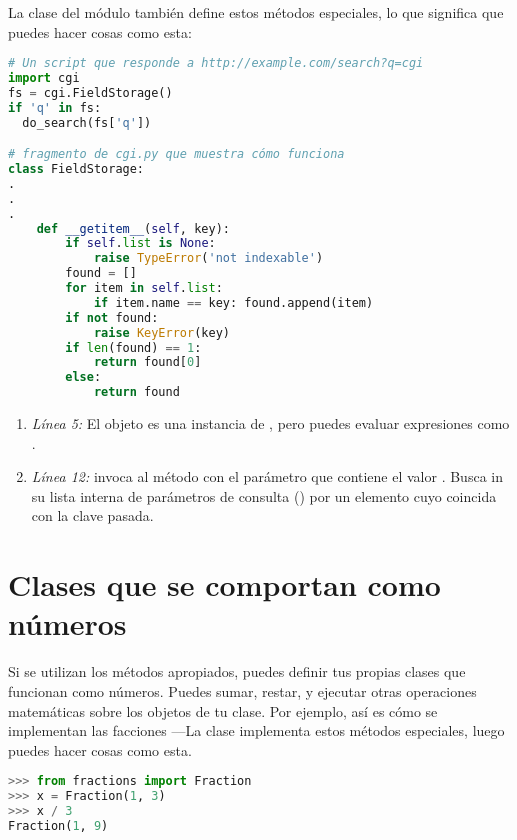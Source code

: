 La clase \href{http://www.diveintopython3.net/special-method-names.html#acts-like-set-example}{} del módulo \href{http://docs.python.org/3.1/library/cgi.html}{} también define estos métodos especiales, lo que significa que puedes hacer cosas como esta:


\begin{lstlisting}[language=Python,breaklines=true,mathescape=false]
# Un script que responde a http://example.com/search?q=cgi
import cgi
fs = cgi.FieldStorage()
if 'q' in fs:
  do_search(fs['q'])    

# fragmento de cgi.py que muestra cómo funciona
class FieldStorage:
.
.
.
    def __getitem__(self, key): 
        if self.list is None:
            raise TypeError('not indexable')
        found = []
        for item in self.list:
            if item.name == key: found.append(item)
        if not found:
            raise KeyError(key)
        if len(found) == 1:
            return found[0]
        else:
            return found
\end{lstlisting}


\begin{enumerate}
  \item \emph{Línea 5:} El objeto  es una instancia de , pero puedes evaluar expresiones como .
  \item \emph{Línea 12:}  invoca al método  con el parámetro  que contiene el valor . Busca in su lista interna de parámetros de consulta () por un elemento cuyo  coincida con la clave pasada.
\end{enumerate}

\section{Clases que se comportan como números}

Si se utilizan los métodos apropiados, puedes definir tus propias clases que funcionan como números. Puedes sumar, restar, y ejecutar otras operaciones matemáticas sobre los objetos de tu clase. Por ejemplo, así es cómo se implementan las facciones ---La clase  implementa estos métodos especiales, luego puedes hacer cosas como esta.


\begin{lstlisting}[language=Python,breaklines=true,mathescape=false]
>>> from fractions import Fraction
>>> x = Fraction(1, 3)
>>> x / 3
Fraction(1, 9)
\end{lstlisting}



